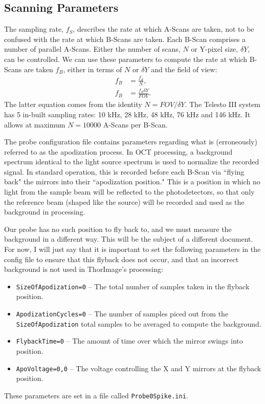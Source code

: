 \documentclass{article}
\begin{document}
\subsection{Scanning Parameters}
\par{The sampling rate, $f_S$, describes the rate at which A-Scans are taken, not to be confused with the rate at which B-Scans are taken. Each B-Scan comprises a number of parallel A-Scans. Either the number of scans, $N$ or Y-pixel size, $\delta Y$, can be controlled. We can use these parameters to compute the rate at which B-Scans are taken $f_B$, either in terms of $N$ or $\delta Y$ and the field of view: 
	\begin{align}
		f_B &= \frac{f_S}{N}, \\
		f_B &= \frac{f_S\delta Y}{FOV}.
	\end{align}
The latter equation comes from the identity $N = FOV/\delta Y$. The Telesto III system has 5 in-built sampling rates: 10 kHz, 28 kHz, 48 kHz, 76 kHz and 146 kHz. It allows at maximum $N=10000$ A-Scans per B-Scan.}
\par{The probe configuration file contains parameters regarding what is (erroneously) referred to as the apodization process. In OCT processing, a background spectrum identical to the light source spectrum is used to normalize the recorded signal. In standard operation, this is recorded before each B-Scan via ``flying back" the mirrors into their ``apodization position." This is a position in which no light from the sample beam will be reflected to the photodetectors, so that only the reference beam (shaped like the source) will be recorded and used as the background in processing.}
\par{Our probe has no such position to fly back to, and we must measure the background in a different way. This will be the subject of a different document. For now, I will just say that it is important to set the following parameters in the config file to ensure that this flyback does not occur, and that an incorrect background is not used in ThorImage's processing:
\begin{itemize}
	\item{\texttt{SizeOfApodization=0} -- The total number of samples taken in the flyback position.}
	\item{\texttt{ApodizationCycles=0} -- The number of samples piced out from the \texttt{SizeOfApodization} total samples to be averaged to compute the background.}
	\item{\texttt{FlybackTime=0} -- The amount of time over which the mirror swings into position.}
	\item{\texttt{ApoVoltage=0,0} -- The voltage controlling the X and Y mirrors at the flyback position.}
\end{itemize}
These parameters are set in a file called \texttt{Probe0Spike.ini}.}
\end{document}
